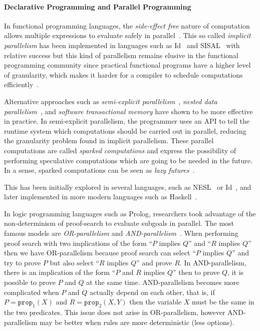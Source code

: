 \paragraph{Declarative Programming and Parallel Programming}

In functional programming languages, the \emph{side-effect free} nature of
computation allows multiple expressions to evaluate safely in
parallel~\cite{Loidl:2003}. This so called \emph{implicit parallelism} has been
implemented in languages such as Id~\cite{Nikhil93anoverview} and
SISAL~\cite{gaudiot2001sisal} with relative success but this kind of parallelism
remains elusive in the functional programming community since practical
functional programs have a higher level of granularity, which makes it harder
for a compiler to schedule computations efficiently~\cite{haskell_tutorial}.

Alternative approaches such as \emph{semi-explicit
parallelism}~\cite{Marlow:2010}, \emph{nested data
parallelism}~\cite{Blelloch:1996:PPA:227234.227246}, and \emph{software
transactional memory} have shown to be more effective in practice. In
semi-explicit parallelism, the programmer uses an API to tell the runtime system
which computations should be carried out in parallel, reducing the granularity
problem found in implicit parallelism. These parallel
computations are called \emph{sparked computations} and express the possibility
of performing speculative computations which are going to be needed in the
future. In a sense, sparked computations can be seen as \emph{lazy
futures}~\cite{Baker:1977}.

This has been initially explored in several languages, such as
NESL~\cite{Blelloch:1996:PPA:227234.227246} or Id~\cite{Nikhil93anoverview}, and
later implemented in more modern languages such as
Haskell~\cite{Chakravarty07dataparallel}.

In logic programming languages such as Prolog, researchers took advantage of the
non-determinism of proof-search to evaluate subgoals in parallel. The most
famous models are \emph{OR-parallelism} and
\emph{AND-parallelism}~\cite{Gupta:2001:PEP:504083.504085}. When performing
proof search with two implications of the form ``$P$ implies $Q$'' and ``$R$
implies $Q$'' then we have OR-parallelism because proof search can select ``$P$
implies $Q$'' and try to prove $P$ but also select ``$R$ implies $Q$'' and prove
$R$. In AND-parallelism, there is an implication of the form ``$P$ and $R$
implies $Q$'' then to prove $Q$, it is possible to prove $P$ and $Q$ at the same
time. AND-parallelism becomes more complicated when $P$ and $Q$ actually depend
on each other, that is, if $P = \mathtt{prop}_1(X)$ and $R = \mathtt{prop}_2(X,
Y)$ then the variable $X$ must be the same in the two predicates. This issue
does not arise in OR-parallelism, however AND-parallelism may be better when
rules are more deterministic (less options).


